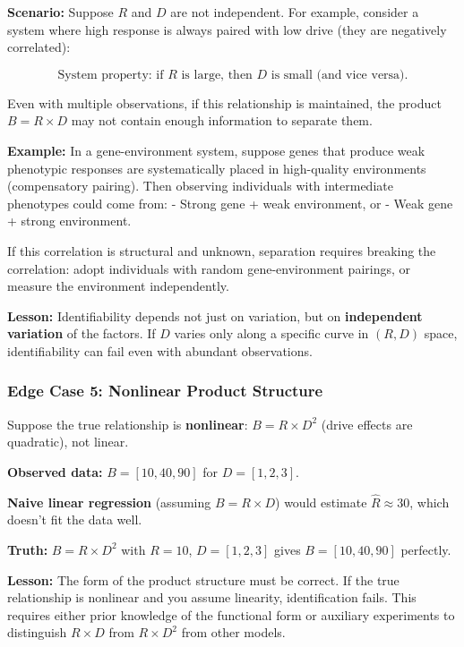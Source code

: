 \documentclass[
]{article}
\begin{document}
\textbf{Scenario:} Suppose \(R\) and \(D\) are not independent. For
example, consider a system where high response is always paired with low
drive (they are negatively correlated):

\[\text{System property: if } R \text{ is large, then } D \text{ is small (and vice versa).}\]

Even with multiple observations, if this relationship is maintained, the
product \(B = R \times D\) may not contain enough information to
separate them.

\textbf{Example:} In a gene-environment system, suppose genes that
produce weak phenotypic responses are systematically placed in
high-quality environments (compensatory pairing). Then observing
individuals with intermediate phenotypes could come from: - Strong gene
+ weak environment, or - Weak gene + strong environment.

If this correlation is structural and unknown, separation requires
breaking the correlation: adopt individuals with random gene-environment
pairings, or measure the environment independently.

\textbf{Lesson:} Identifiability depends not just on variation, but on
\textbf{independent variation} of the factors. If \(D\) varies only
along a specific curve in \((R, D)\) space, identifiability can fail
even with abundant observations.

\subsubsection{Edge Case 5: Nonlinear Product
Structure}\label{edge-case-5-nonlinear-product-structure}

Suppose the true relationship is \textbf{nonlinear}:
\(B = R \times D^2\) (drive effects are quadratic), not linear.

\textbf{Observed data:} \(B = [10, 40, 90]\) for \(D = [1, 2, 3]\).

\textbf{Naive linear regression} (assuming \(B = R \times D\)) would
estimate \(\widehat{R} \approx 30\), which doesn't fit the data well.

\textbf{Truth:} \(B = R \times D^2\) with \(R = 10\), \(D = [1, 2, 3]\)
gives \(B = [10, 40, 90]\) perfectly.

\textbf{Lesson:} The form of the product structure must be correct. If
the true relationship is nonlinear and you assume linearity,
identification fails. This requires either prior knowledge of the
functional form or auxiliary experiments to distinguish \(R \times D\)
from \(R \times D^2\) from other models.
\end{document}
